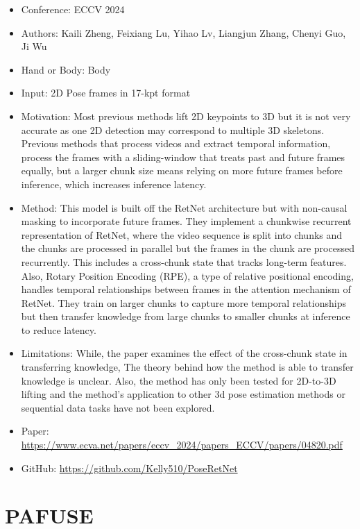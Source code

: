 \documentclass{article}
\begin{document}
\begin{itemize}
    \item Conference: ECCV 2024
    \item Authors: Kaili Zheng, Feixiang Lu, Yihao Lv, Liangjun Zhang, Chenyi Guo, Ji Wu
    \item Hand or Body: Body
    \item Input: 2D Pose frames in 17-kpt format
    \item Motivation: Most previous methods lift 2D keypoints to 3D but it is not very accurate as one 2D detection may correspond to multiple 3D skeletons. Previous methods that process videos and extract temporal information, process the frames with a sliding-window that treats past and future frames equally, but a larger chunk size means relying on more future frames before inference, which increases inference latency.
    \item Method: This model is built off the RetNet architecture but with non-causal masking to incorporate future frames. They implement a chunkwise recurrent representation of RetNet, where the video sequence is split into chunks and the chunks are processed in parallel but the frames in the chunk are processed recurrently. This includes a cross-chunk state that tracks long-term features. Also, Rotary Position Encoding (RPE), a type of relative positional encoding, handles temporal relationships between frames in the attention mechanism of RetNet. They train on larger chunks to capture more temporal relationships but then transfer knowledge from large chunks to smaller chunks at inference to reduce latency.
    \item Limitations: While, the paper examines the effect of the cross-chunk state in transferring knowledge, The theory behind how the method is able to transfer knowledge is unclear. Also, the method has only been tested for 2D-to-3D lifting and the method's application to other 3d pose estimation methods or sequential data tasks have not been explored.
    \item Paper: \url{https://www.ecva.net/papers/eccv_2024/papers_ECCV/papers/04820.pdf}
    \item GitHub: \url{https://github.com/Kelly510/PoseRetNet}
\end{itemize}

\section*{PAFUSE}
\end{document}
